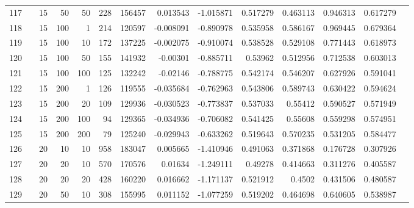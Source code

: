 \begin{longtable}{llrrrrrrrrrrrr}
		117 & &           15 &                50 &           50 &         228 &     156457 &  0.013543 & -1.015871 &  0.517279 &    0.463113 &       0.946313 &  0.617279 \\
		118 & &           15 &               100 &            1 &         214 &     120597 & -0.008091 & -0.890978 &  0.535958 &    0.586167 &       0.969445 &  0.679364 \\
		119 & &           15 &               100 &           10 &         172 &     137225 & -0.002075 & -0.910074 &  0.538528 &    0.529108 &       0.771443 &  0.618973 \\
		120 & &           15 &               100 &           50 &         155 &     141932 &  -0.00301 & -0.885711 &   0.53962 &    0.512956 &       0.712538 &  0.603013 \\
		121 & &           15 &               100 &          100 &         125 &     132242 &  -0.02146 & -0.788775 &  0.542174 &    0.546207 &       0.627926 &  0.591041 \\
		122 & &           15 &               200 &            1 &         126 &     119555 & -0.035684 & -0.762963 &  0.543806 &    0.589743 &       0.630422 &  0.594624 \\
		123 & &           15 &               200 &           20 &         109 &     129936 & -0.030523 & -0.773837 &  0.537033 &     0.55412 &       0.590527 &  0.571949 \\
		124 & &           15 &               200 &          100 &          94 &     129365 & -0.034936 & -0.706082 &  0.541425 &     0.55608 &       0.559298 &  0.574951 \\
		125 & &           15 &               200 &          200 &          79 &     125240 & -0.029943 & -0.633262 &  0.519643 &    0.570235 &       0.531205 &  0.584477 \\
		126 & &           20 &                10 &           10 &         958 &     183047 &  0.005665 & -1.410946 &  0.491063 &    0.371868 &       0.176728 &  0.307926 \\
		127 & &           20 &                20 &           10 &         570 &     170576 &   0.01634 & -1.249111 &   0.49278 &    0.414663 &       0.311276 &  0.405587 \\
		128 & &           20 &                20 &           20 &         428 &     160220 &  0.016662 & -1.171137 &  0.521912 &      0.4502 &       0.431506 &  0.480587 \\
		129 & &           20 &                50 &           10 &         308 &     155995 &  0.011152 & -1.077259 &  0.519202 &    0.464698 &       0.640605 &  0.538987 \\

\end{longtable}
